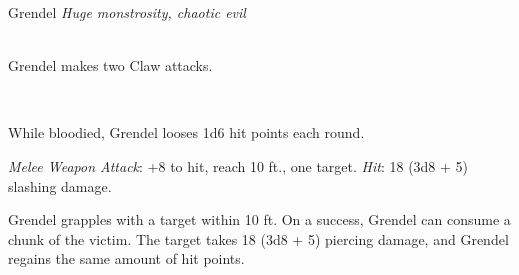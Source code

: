 \documentclass[10pt,twoside,twocolumn,openany]{book}
\begin{document}
\vspace{4.1cm}

\begin{monsterbox}{Grendel}
	\textit{Huge monstrosity, chaotic evil}\\
	\hline
	\basics[%
	armorclass = 12,
	hitpoints  = 105 (10d12 + 40),
	speed      = 60 ft
	]
	\hline
	\stats[
    STR = \stat{25},
    DEX = \stat{8},
    CON = \stat{19},
    INT = \stat{5},
    WIS = \stat{10},
    CHA = \stat{7}
	]
	\hline
	\details[%
	senses = {darkvision 60ft., passive Perception 16},
	languages = {Common, Abyssal},
	damageimmunities = {Any armed attacks},
	damageresistances = {Magic},
	challenge = 5
	]
	\hline \\[1mm]
	\begin{monsteraction}[Multiattack]
		Grendel makes two Claw attacks.
	\end{monsteraction}\\
	\begin{monsteraction}[It Bleeds]
		While bloodied, Grendel looses 1d6 hit points each round.
	\end{monsteraction}
	\begin{monsteraction}[Claw]
		\textit{Melee Weapon Attack}: +8 to hit, reach 10 ft., one target. \textit{Hit}: 18 (3d8 + 5) slashing damage.
	\end{monsteraction}

	\begin{monsteraction}[Consume]
    	Grendel grapples with a target within 10 ft. On a success, Grendel can consume a chunk of the victim. The target takes 18 (3d8 + 5) piercing damage, and Grendel regains the same amount of hit points.
	\end{monsteraction}
\end{monsterbox}
\end{document}
